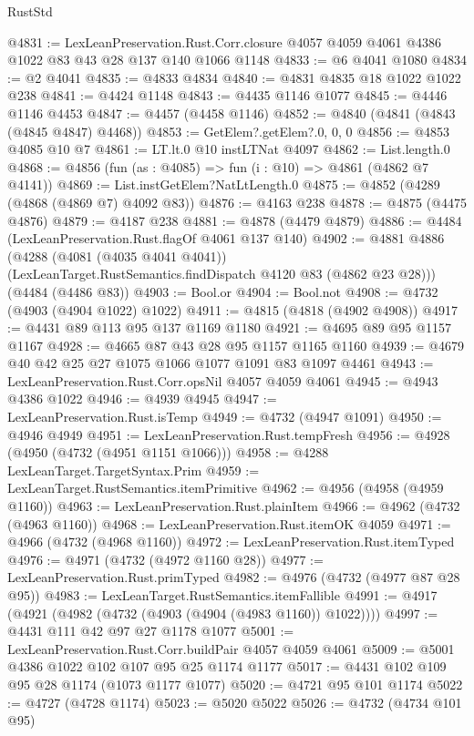 \begin{lexlean}{RustStd}
\begin{coremodule}
{\begin{coremodule}
{{{{{{{{{{{{{{@4831 := LexLeanPreservation.Rust.Corr.closure
    @4057
    @4059
    @4061
    @4386
    @1022
    @83
    @43
    @28
    @137
    @140
    @1066
    @1148
@4833 := @6 @4041 @1080
@4834 := @2 @4041
@4835 := @4833 @4834
@4840 := @4831 @4835 @18 @1022 @1022 @238
@4841 := @4424 @1148
@4843 := @4435 @1146 @1077
@4845 := @4446 @1146 @4453
@4847 := @4457 (@4458 @1146)
@4852 := @4840 (@4841 (@4843 (@4845 @4847) @4468))
@4853 := GetElem?.getElem?.{0, 0, 0}
@4856 := @4853 @4085 @10 @7
@4861 := LT.lt.{0} @10 instLTNat @4097
@4862 := List.length.{0}
@4868 := @4856 (fun (as : @4085) => fun (i : @10) => @4861 (@4862 @7 @4141))
@4869 := List.instGetElem?NatLtLength.{0}
@4875 := @4852 (@4289 (@4868 (@4869 @7) @4092 @83))
@4876 := @4163 @238
@4878 := @4875 (@4475 @4876)
@4879 := @4187 @238
@4881 := @4878 (@4479 @4879)
@4886 := @4484 (LexLeanPreservation.Rust.flagOf @4061 @137 @140)
@4902 := @4881
    @4886
    (@4288
      (@4081 (@4035 @4041 @4041))
      (LexLeanTarget.RustSemantics.findDispatch @4120 @83 (@4862 @23 @28)))
    (@4484 (@4486 @83))
@4903 := Bool.or
@4904 := Bool.not
@4908 := @4732 (@4903 (@4904 @1022) @1022)
@4911 := @4815 (@4818 (@4902 @4908))
@4917 := @4431 @89 @113 @95 @137 @1169 @1180
@4921 := @4695 @89 @95 @1157 @1167
@4928 := @4665 @87 @43 @28 @95 @1157 @1165 @1160
@4939 := @4679 @40 @42 @25 @27 @1075 @1066 @1077 @1091 @83 @1097 @4461
@4943 := LexLeanPreservation.Rust.Corr.opsNil @4057 @4059 @4061
@4945 := @4943 @4386 @1022
@4946 := @4939 @4945
@4947 := LexLeanPreservation.Rust.isTemp
@4949 := @4732 (@4947 @1091)
@4950 := @4946 @4949
@4951 := LexLeanPreservation.Rust.tempFresh
@4956 := @4928 (@4950 (@4732 (@4951 @1151 @1066)))
@4958 := @4288 LexLeanTarget.TargetSyntax.Prim
@4959 := LexLeanTarget.RustSemantics.itemPrimitive
@4962 := @4956 (@4958 (@4959 @1160))
@4963 := LexLeanPreservation.Rust.plainItem
@4966 := @4962 (@4732 (@4963 @1160))
@4968 := LexLeanPreservation.Rust.itemOK @4059
@4971 := @4966 (@4732 (@4968 @1160))
@4972 := LexLeanPreservation.Rust.itemTyped
@4976 := @4971 (@4732 (@4972 @1160 @28))
@4977 := LexLeanPreservation.Rust.primTyped
@4982 := @4976 (@4732 (@4977 @87 @28 @95))
@4983 := LexLeanTarget.RustSemantics.itemFallible
@4991 := @4917 (@4921 (@4982 (@4732 (@4903 (@4904 (@4983 @1160)) @1022))))
@4997 := @4431 @111 @42 @97 @27 @1178 @1077
@5001 := LexLeanPreservation.Rust.Corr.buildPair @4057 @4059 @4061
@5009 := @5001 @4386 @1022 @102 @107 @95 @25 @1174 @1177
@5017 := @4431 @102 @109 @95 @28 @1174 (@1073 @1177 @1077)
@5020 := @4721 @95 @101 @1174
@5022 := @4727 (@4728 @1174)
@5023 := @5020 @5022
@5026 := @4732 (@4734 @101 @95)
}}}}}}}}}}}}}}
\end{coremodule}}
\end{coremodule}
\end{lexlean}
